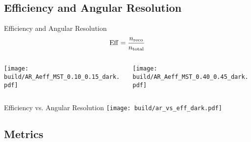 \subsection{Efficiency and Angular Resolution}%
\label{sub:Efficiency_AR}

\begin{frame}{Efficiency and Angular Resolution}
    \begin{equation*}
        \operatorname{Eff} = \frac{n_\text{reco}}{n_\text{total}}
    \end{equation*}
    \begin{columns}
        \begin{column}{0.48\textwidth}
            \centering
            \texttt{[image: build/AR\_Aeff\_MST\_0.10\_0.15\_dark.pdf]}
        \end{column}
        \begin{column}{0.48\textwidth}
            \centering
            \texttt{[image: build/AR\_Aeff\_MST\_0.40\_0.45\_dark.pdf]}
        \end{column}
    \end{columns}
\end{frame}

\begin{frame}{Efficiency vs. Angular Resolution}
    \centering
    \texttt{[image: build/ar\_vs\_eff\_dark.pdf]}
\end{frame}

\subsection{Metrics}%
\label{sub:Metrics}

